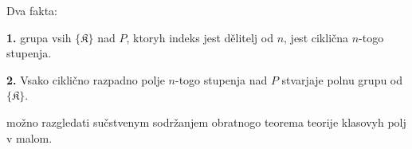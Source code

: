 \documentclass[11pt]{article}
\begin{document}
Dva fakta:

\noindent\textbf{1.} grupa vsih \(\{\mathfrak K\}\) nad \(P\), ktoryh indeks jest dělitelj od \(n\), jest ciklična \(n\)-togo stupenja.

\noindent\textbf{2.} Vsako ciklično razpadno polje \(n\)-togo stupenja nad \(P\) stvarjaje polnu grupu od \(\{\mathfrak K\}\).

možno razgledati sučstvenym sodržanjem obratnogo teorema teorije klasovyh polj v malom.


\clearpage
\end{document}
